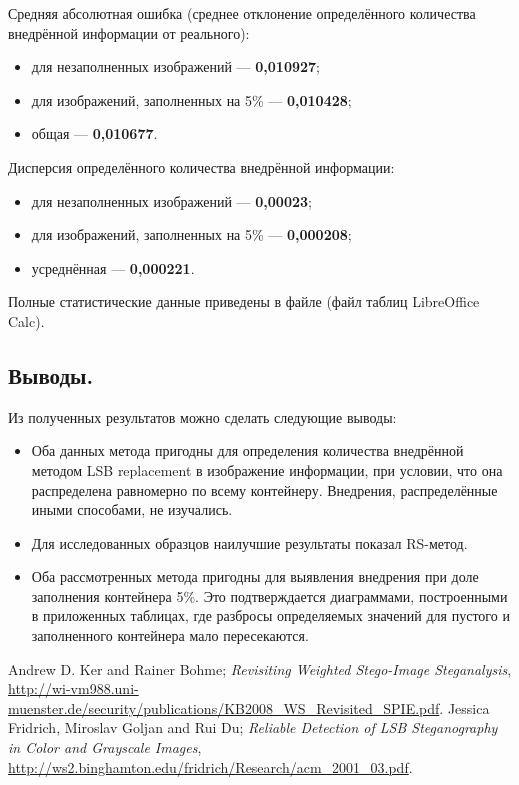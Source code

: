 \documentclass[12pt,a4paper,russian,numbers=endperiod]{scrartcl}
\begin{document}
Средняя абсолютная ошибка (среднее отклонение определённого количества внедрённой информации от реального):

\begin{itemize}
	\item для незаполненных изображений --- \textbf{0,010927};
	\item для изображений, заполненных на 5\% --- \textbf{0,010428};
	\item общая --- \textbf{0,010677}.
\end{itemize}

Дисперсия определённого количества внедрённой информации:

\begin{itemize}
	\item для незаполненных изображений --- \textbf{0,00023};
	\item для изображений, заполненных на 5\% --- \textbf{0,000208};
	\item усреднённая --- \textbf{0,000221}.
\end{itemize}

Полные статистические данные приведены в файле  (файл таблиц LibreOffice Calc).

\subsection{Выводы.}

Из полученных результатов можно сделать следующие выводы:

\begin{itemize}
	\item Оба данных метода пригодны для определения количества внедрённой методом LSB replacement в изображение информации, при условии, что она распределена равномерно по всему контейнеру. Внедрения, распределённые иными способами, не изучались.
	\item Для исследованных образцов наилучшие результаты показал RS-метод.
	\item Оба рассмотренных метода пригодны для выявления внедрения при доле заполнения контейнера 5\%. Это подтверждается диаграммами, построенными в приложенных таблицах, где разбросы определяемых значений для пустого и заполненного контейнера мало пересекаются.
\end{itemize}

\begin{thebibliography}{9}
	 Andrew D. Ker and Rainer Bohme; \emph{Revisiting Weighted Stego-Image Steganalysis}, \url{http://wi-vm988.uni-muenster.de/security/publications/KB2008_WS_Revisited_SPIE.pdf}.
	 Jessica Fridrich, Miroslav Goljan and Rui Du; \emph{Reliable Detection of LSB Steganography in Color and Grayscale Images}, \url{http://ws2.binghamton.edu/fridrich/Research/acm_2001_03.pdf}.
\end{thebibliography}


\end{document}
